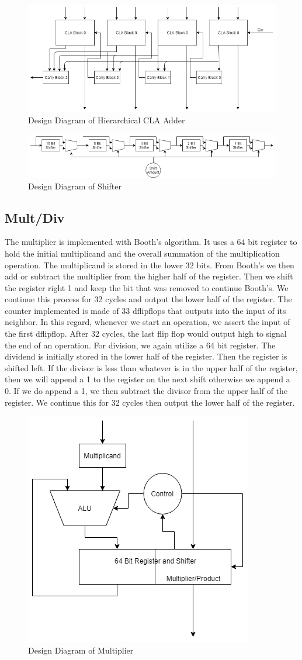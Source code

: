 \documentclass[letterpaper]{article} %
\begin{document}
\begin{figure}[htb!]
    \centering
    \includegraphics[width=.35\textwidth]{claAdderDiagram.png}
    \caption{Design Diagram of Hierarchical CLA Adder}
\end{figure}

\begin{figure}[htb!]
    \centering
    \includegraphics[width=.6\textwidth]{shifterDiagram.png}
    \caption{Design Diagram of Shifter}
\end{figure}

\subsection*{Mult/Div}
The multiplier is implemented with Booth's algorithm. It uses a 64 bit register to hold the initial multiplicand and the overall summation of the multiplication operation. The multiplicand is stored in the lower 32 bits. From Booth's we then add or subtract the multiplier from the higher half of the register. Then we shift the register right 1 and keep the bit that was removed to continue Booth's. We continue this process for 32 cycles and output the lower half of the register. The counter implemented is made of 33 dflipflops that outputs into the input of its neighbor. In this regard, whenever we start an operation, we assert the input of the first dflipflop. After 32 cycles, the last flip flop would output high to signal the end of an operation. For division, we again utilize a 64 bit register. The dividend is initially stored in the lower half of the register. Then the register is shifted left. If the divisor is less than whatever is in the upper half of the register, then we will append a 1 to the register on the next shift otherwise we append a 0. If we do append a 1, we then subtract the divisor from the upper half of the register. We continue this for 32 cycles then output the lower half of the register.

\newpage

\begin{figure}[htb!]
    \centering
    \includegraphics[width=.35\textwidth]{multiplierDiagram.png}
    \caption{Design Diagram of Multiplier}
\end{figure}
\end{document}
